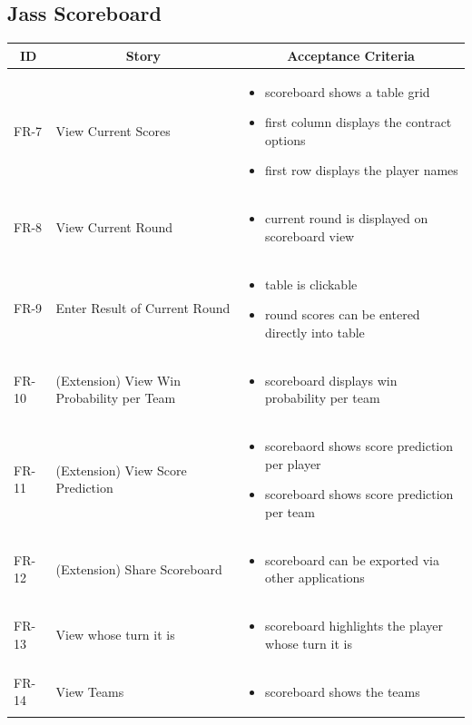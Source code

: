 \subsection{Jass Scoreboard}
\begin{tabular} { | m{1.25cm} | m{5.75cm} | m{6cm} | }
    \hline
    \multicolumn{1}{|c|}{\textbf{ID}} & \multicolumn{1}{|c|}{ \textbf{Story} } & \multicolumn{1}{|c|}{ \textbf{Acceptance Criteria} } \\
    \hline
    FR-7 & View Current Scores & \begin{itemize}[-]
        \item scoreboard shows a table grid
        \item first column displays the contract options
        \item first row displays the player names
    \end{itemize}\\
    \hline
    FR-8 & View Current Round & \begin{itemize}[-]
        \item current round is displayed on scoreboard view
    \end{itemize}\\
    \hline
    FR-9 & Enter Result of Current Round & \begin{itemize}[-]
        \item table is clickable
        \item round scores can be entered directly into table
    \end{itemize}\\
    \hline
    FR-10 & (Extension) View Win Probability per Team & \begin{itemize}[-]
        \item scoreboard displays win probability per team
    \end{itemize} \\
    \hline
    FR-11 & (Extension) View Score Prediction & \begin{itemize}[-]
        \item scorebaord shows score prediction per player
        \item scoreboard shows score prediction per team
    \end{itemize} \\
    \hline
    FR-12 & (Extension) Share Scoreboard & \begin{itemize}[-]
        \item scoreboard can be exported via other applications 
    \end{itemize}\\
    \hline
    FR-13 & View whose turn it is &  \begin{itemize}[-]
        \item scoreboard highlights the player whose turn it is
    \end{itemize}\\
    \hline
    FR-14 & View Teams & \begin{itemize}[-]
        \item scoreboard shows the teams 
    \end{itemize}\\
    \hline
\end{tabular}

